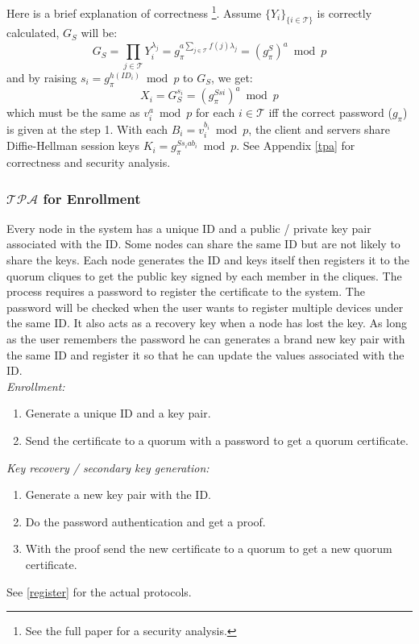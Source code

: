 \ifdefined\ABSTRACT
Here is a brief explanation of correctness
\footnote{See the full paper for a security analysis.}.
Assume $\{Y_i\}_{\{i \in \mathcal{T}\}}$ is correctly calculated,
$G_S$ will be:
\[
  G_S = \prod_{j \in \mathcal{T}}Y_i^{\lambda_j} = g_{\pi}^{a \sum_{j
      \in \mathcal{T}} f(j) \lambda_j} = (g_{\pi}^S)^a \bmod p
\]
and by raising $s_i = g_{\pi}^{h(ID_i)} \bmod p$ to $G_S$, we get:
\[
  X_i = G_S^{s_i} = (g_{\pi}^{Ssi})^a \bmod p
\]
which must be the same as $v_i^a \bmod p$ for each $i \in
\mathcal{T}$ iff the correct password ($g_{\pi}$) is given at the
step 1. With each $B_i = v_i^{b_i} \bmod p$, the client and servers
share Diffie-Hellman session keys $K_i = g_{\pi}^{Ss_iab_i} \bmod p$.
\else
See Appendix \ref{tpa} for correctness and security analysis.
\fi

\subsubsection*{$\mathcal{TPA}$ for Enrollment}
Every node in the system has a unique ID and a public / private key
pair associated with the ID. Some nodes can share the same ID but are
not likely to share the keys. Each node generates the ID and keys
itself then registers it to the quorum cliques to get the public key
signed by each member in the cliques. The process requires a password
to register the certificate to the system. The password will be checked
when the user wants to register multiple devices under the
same ID. It also acts as a recovery key when a node has lost the
key. As long as the user remembers the password he can generates a
brand new key pair with the same ID and register it so that he can
update the values associated with the ID.\\

\noindent
{\em Enrollment:}
\begin{enumerate}
\item Generate a unique ID and a key pair.
\item Send the certificate to a quorum with a password to get a
  quorum certificate.
\end{enumerate}

\noindent
{\em Key recovery / secondary key generation:}
\begin{enumerate}
\item Generate a new key pair with the ID.
\item Do the password authentication and get a proof.
\item With the proof send the new certificate to a quorum to get a new
  quorum certificate.
\end{enumerate}
\ifdefined\ABSTRACT
\else
See \ref{register} for the actual protocols.
\fi


